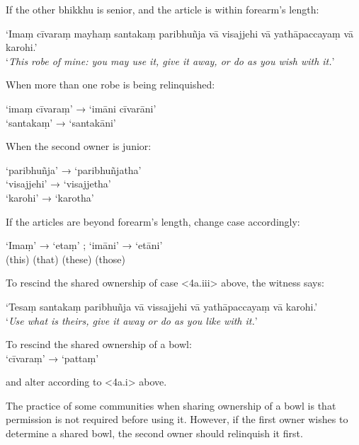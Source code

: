 If the other bhikkhu is senior, and the article is within forearm’s length:

‘Imaṃ cīvaraṃ mayhaṃ santakaṃ paribhuñja vā visajjehi vā yathāpaccayaṃ vā karohi.’\\
‘\emph{This robe of mine: you may use it, give it away, or do as you wish with it.}’


When more than one robe is being relinquished:

‘imaṃ cīvaraṃ’ → ‘imāni cīvarāni’\\
‘santakaṃ’ → ‘santakāni’

When the second owner is junior:

‘paribhuñja’ → ‘paribhuñjatha’\\
‘visajjehi’ → ‘visajjetha’\\
‘karohi’ → ‘karotha’

If the articles are beyond forearm's length, change case accordingly:

‘Imaṃ’ → ‘etaṃ’ ; ‘imāni’ → ‘etāni’\\
(this) (that) (these) (those)


To rescind the shared ownership of case <4a.iii> above, the witness says:

‘Tesaṃ santakaṃ paribhuñja vā vissajjehi vā yathāpaccayaṃ vā karohi.’\\
‘\emph{Use what is theirs, give it away or do as you like with it.}’

To rescind the shared ownership of a bowl:\\
‘cīvaraṃ’ → ‘pattaṃ’


and alter according to <4a.i> above.

The practice of some communities when sharing ownership of a bowl is that
permission is not required before using it. However, if the first owner wishes
to determine a shared bowl, the second owner should relinquish it first.

